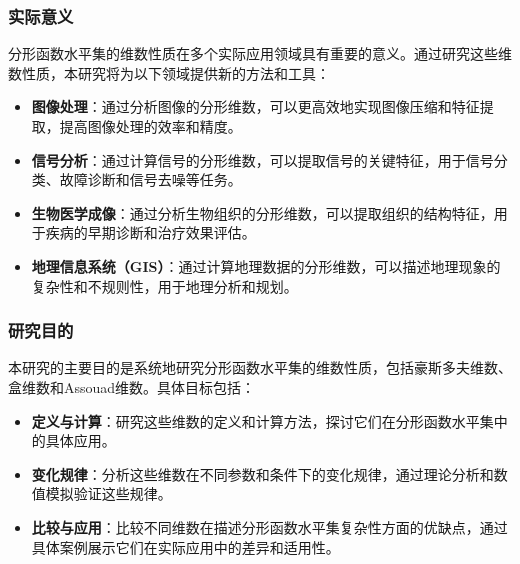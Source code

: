 \subsubsection{实际意义}
分形函数水平集的维数性质在多个实际应用领域具有重要的意义。通过研究这些维数性质，本研究将为以下领域提供新的方法和工具：
\begin{itemize}
      \item \textbf{图像处理}：通过分析图像的分形维数，可以更高效地实现图像压缩和特征提取，提高图像处理的效率和精度。
      \item \textbf{信号分析}：通过计算信号的分形维数，可以提取信号的关键特征，用于信号分类、故障诊断和信号去噪等任务。
      \item \textbf{生物医学成像}：通过分析生物组织的分形维数，可以提取组织的结构特征，用于疾病的早期诊断和治疗效果评估。
      \item \textbf{地理信息系统（GIS）}：通过计算地理数据的分形维数，可以描述地理现象的复杂性和不规则性，用于地理分析和规划。
\end{itemize}

\subsubsection{研究目的}
本研究的主要目的是系统地研究分形函数水平集的维数性质，包括豪斯多夫维数、盒维数和Assouad维数。具体目标包括：
\begin{itemize}
      \item \textbf{定义与计算}：研究这些维数的定义和计算方法，探讨它们在分形函数水平集中的具体应用。
      \item \textbf{变化规律}：分析这些维数在不同参数和条件下的变化规律，通过理论分析和数值模拟验证这些规律。
      \item \textbf{比较与应用}：比较不同维数在描述分形函数水平集复杂性方面的优缺点，通过具体案例展示它们在实际应用中的差异和适用性。
\end{itemize}
